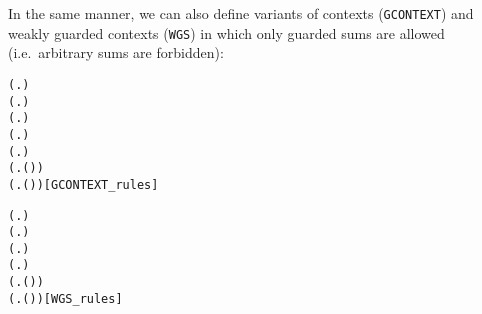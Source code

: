 In the same manner, we can also define variants of contexts (\texttt{GCONTEXT}) and weakly guarded
contexts (\texttt{WGS}) in which only guarded sums are allowed (i.e.~arbitrary sums are forbidden):
\begin{alltt}
 (\HOLTokenLambda{}. )
 (\HOLTokenLambda{}. )
  \HOLSymConst{\HOLTokenImp{}}  (\HOLTokenLambda{}.  )
  \HOLSymConst{\HOLTokenConj{}}   \HOLSymConst{\HOLTokenImp{}}  (\HOLTokenLambda{}.   \HOLSymConst{\ensuremath{+}}  )
  \HOLSymConst{\HOLTokenConj{}}   \HOLSymConst{\HOLTokenImp{}}  (\HOLTokenLambda{}.   \HOLSymConst{\ensuremath{\parallel}}  )
  \HOLSymConst{\HOLTokenImp{}}  (\HOLTokenLambda{}. \HOLSymConst{\ensuremath{\nu}}  ( ))
  \HOLSymConst{\HOLTokenImp{}}  (\HOLTokenLambda{}.  ( ) )\hfill{[GCONTEXT_rules]}
\end{alltt}
\begin{alltt}
 (\HOLTokenLambda{}. )
  \HOLSymConst{\HOLTokenImp{}}  (\HOLTokenLambda{}.  )
  \HOLSymConst{\HOLTokenConj{}}   \HOLSymConst{\HOLTokenImp{}}  (\HOLTokenLambda{}.   \HOLSymConst{\ensuremath{+}}  )
  \HOLSymConst{\HOLTokenConj{}}   \HOLSymConst{\HOLTokenImp{}}  (\HOLTokenLambda{}.   \HOLSymConst{\ensuremath{\parallel}}  )
  \HOLSymConst{\HOLTokenImp{}}  (\HOLTokenLambda{}. \HOLSymConst{\ensuremath{\nu}}  ( ))
  \HOLSymConst{\HOLTokenImp{}}  (\HOLTokenLambda{}.  ( ) )\hfill{[WGS_rules]}
\end{alltt}

